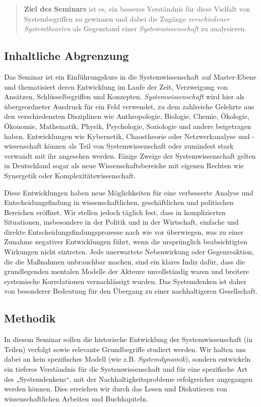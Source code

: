 \documentclass[11pt,a4paper]{article}
\begin{document}
\begin{quote}
  \textbf{Ziel des Seminars} ist es, ein besseres Verständnis für diese
  Vielfalt von Systembegriffen zu gewinnen und dabei die Zugänge
  \emph{verschiedener Systemtheorien} als Gegenstand einer
  \emph{Systemwissenschaft} zu analysieren.
\end{quote}

\subsection{Inhaltliche Abgrenzung}

Das Seminar ist ein Einführungskurs in die Systemwissenschaft auf Master-Ebene
und thematisiert deren Entwicklung im Laufe der Zeit, Verzweigung von
Ansätzen, Schlüsselbegriffen und Konzepten.  \emph{Systemwissenschaft} wird
hier als übergeordneter Ausdruck für ein Feld verwendet, zu dem zahlreiche
Gelehrte aus den verschiedensten Disziplinen wie Anthropologie, Biologie,
Chemie, Ökologie, Ökonomie, Mathematik, Physik, Psychologie, Soziologie und
andere beigetragen haben. Entwicklungen wie Kybernetik, Chaostheorie oder
Netzwerkanalyse und -wissenschaft können als Teil von Systemwissenschaft oder
zumindest stark verwandt mit ihr angesehen werden.  Einige Zweige der
Systemwissenschaft gelten in Deutschland sogar als neue Wissenschaftsbereiche
mit eigenen Rechten wie Synergetik oder Komplexitätswissenschaft.

Diese Entwicklungen haben neue Möglichkeiten für eine verbesserte Analyse und
Entscheidungsfindung in wissenschaftlichen, geschäftlichen und politischen
Bereichen eröffnet. Wir stellen jedoch täglich fest, dass in komplizierten
Situationen, insbesondere in der Politik und in der Wirtschaft, einfache und
direkte Entscheidungsfindungsprozesse nach wie vor überwiegen, was zu einer
Zunahme negativer Entwicklungen führt, wenn die ursprünglich beabsichtigten
Wirkungen nicht eintreten. Jede unerwartete Nebenwirkung oder Gegenreaktion,
die die Maßnahmen unbrauchbar machen, sind ein klares Indiz dafür, dass die
grundlegenden mentalen Modelle der Akteure unvollständig waren und breitere
systemische Korrelationen vernachlässigt wurden. Das Systemdenken ist daher
von besonderer Bedeutung für den Übergang zu einer nachhaltigeren
Gesellschaft.

\subsection{Methodik}

In diesem Seminar sollen die historische Entwicklung der Systemwissenschaft
(in Teilen) verfolgt sowie relevante Grundbegriffe studiert werden.  Wir
halten uns dabei an kein spezifisches Modell (wie z.B. \emph{Systemdynamik}),
sondern entwickeln ein tieferes Verständnis für die Systemwissenschaft und für
eine spezifische Art des „Systemdenkens“, mit der Nachhaltigkeitsprobleme
erfolgreicher angegangen werden können. Dies erreichen wir durch das Lesen und
Diskutieren von wissenschaftlichen Arbeiten und Buchkapiteln.
\end{document}
